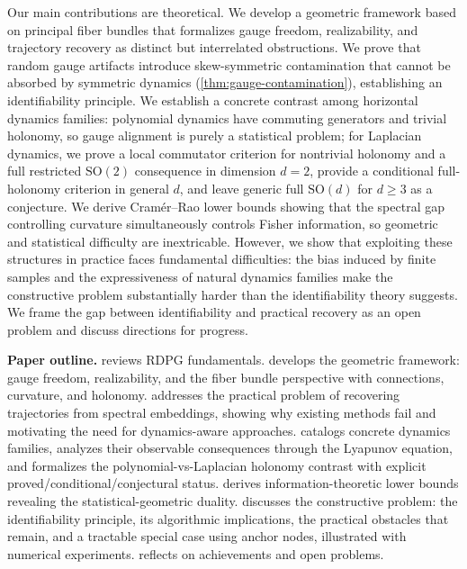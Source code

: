 \documentclass{article}
\theoremstyle{plain}
\theoremstyle{definition}
\theoremstyle{remark}
\begin{document}
Our main contributions are theoretical.
We develop a geometric framework based on principal fiber bundles that formalizes gauge freedom, realizability, and trajectory recovery as distinct but interrelated obstructions.
We prove that random gauge artifacts introduce skew-symmetric contamination that cannot be absorbed by symmetric dynamics (\cref{thm:gauge-contamination}), establishing an identifiability principle.
We establish a concrete contrast among horizontal dynamics families: polynomial dynamics have commuting generators and trivial holonomy, so gauge alignment is purely a statistical problem; for Laplacian dynamics, we prove a local commutator criterion for nontrivial holonomy and a full restricted $\mathrm{SO}(2)$ consequence in dimension $d = 2$, provide a conditional full-holonomy criterion in general $d$, and leave generic full $\mathrm{SO}(d)$ for $d \ge 3$ as a conjecture.
We derive Cram\'er--Rao lower bounds showing that the spectral gap controlling curvature simultaneously controls Fisher information, so geometric and statistical difficulty are inextricable.
However, we show that exploiting these structures in practice faces fundamental difficulties: the bias induced by finite samples and the expressiveness of natural dynamics families make the constructive problem substantially harder than the identifiability theory suggests.
We frame the gap between identifiability and practical recovery as an open problem and discuss directions for progress.

\textbf{Paper outline.}
 reviews RDPG fundamentals.
 develops the geometric framework: gauge freedom, realizability, and the fiber bundle perspective with connections, curvature, and holonomy.
 addresses the practical problem of recovering trajectories from spectral embeddings, showing why existing methods fail and motivating the need for dynamics-aware approaches.
 catalogs concrete dynamics families, analyzes their observable consequences through the Lyapunov equation, and formalizes the polynomial-vs-Laplacian holonomy contrast with explicit proved/conditional/conjectural status.
 derives information-theoretic lower bounds revealing the statistical-geometric duality.
 discusses the constructive problem: the identifiability principle, its algorithmic implications, the practical obstacles that remain, and a tractable special case using anchor nodes, illustrated with numerical experiments.
 reflects on achievements and open problems.
\end{document}
